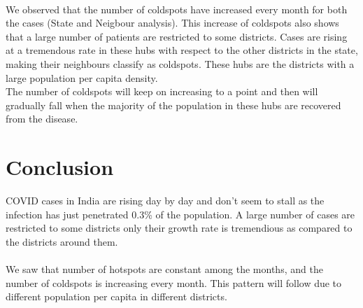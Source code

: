 \documentclass{article}
\begin{document}
\\
We observed that the number of coldspots have increased every month for both the cases (State and Neigbour analysis). This increase of coldspots also shows that a large number of patients are restricted to some districts. Cases are rising at a tremendous rate in these hubs with respect to the other districts in the state, making their neighbours classify as coldspots. These hubs are the districts with a large population per capita density. 
\\
The number of coldspots will keep on increasing to a point and then will gradually fall when the majority of the population in these hubs are recovered from the disease.

\section{Conclusion}
COVID cases in India are rising day by day and don't seem to stall as the infection has just penetrated 0.3\% of the population. A large number of cases are restricted to some districts only their growth rate is tremendious as compared to the districts around them. \\
\\
We saw that number of hotspots are constant among the months, and the number of coldspots is increasing every month. This pattern will follow due to different population per capita in different districts.


\end{document}
